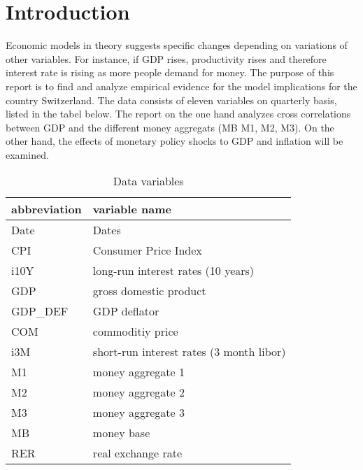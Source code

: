 \documentclass[11pt,a4paper]{report}
\begin{document}
\section*{Introduction}
Economic models in theory suggests specific changes depending on variations of other variables. For instance, if GDP rises, productivity rises and therefore interest rate is rising as more people demand for money. The purpose of this report is to find and analyze empirical evidence for the model implications for the country Switzerland. The data consists of eleven variables on quarterly basis, listed in the tabel below. The report on the one hand analyzes cross correlations between GDP and the different money aggregats (MB M1, M2, M3). On the other hand, the effects of monetary policy shocks to GDP and inflation will be examined. 
\newline
\begin{table}[H]
\centering
\caption{Data variables}
\label{tab: var}
\begin{tabular}{l|l}
	\textbf{abbreviation} & \textbf{variable name}\\\hline\hline
	Date & Dates\\
	CPI & Consumer Price Index \\
	i10Y & long-run interest rates (10 years) \\
	GDP & gross domestic product\\
	GDP\_DEF & GDP deflator \\
	COM & commoditiy price \\
	i3M & short-run interest rates (3 month libor) \\
	M1 & money aggregate 1 \\
	M2 & money aggregate 2 \\
	M3 & money aggregate 3 \\
	MB & money base \\
	RER & real exchange rate \\
\hline
\end{tabular}
\end{table}
 

\newpage
\end{document}
